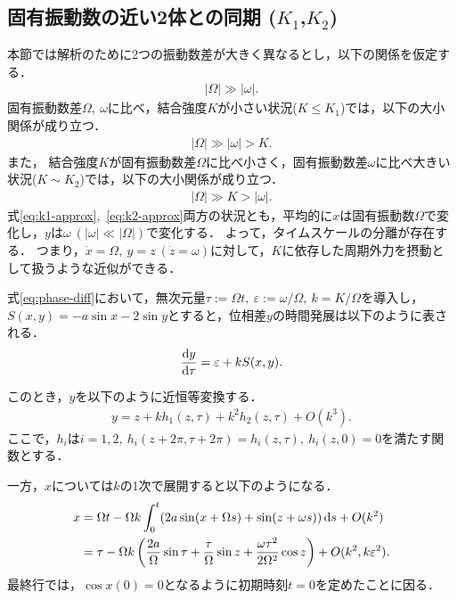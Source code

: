 \documentclass[../main]{subfiles}
\begin{document}
    \subsection{固有振動数の近い2体との同期 ($K_1$,$K_2$)}
    \label{sec:3body-k12}
    本節では解析のために2つの振動数差が大きく異なるとし，以下の関係を仮定する．
    \begin{align}
        \label{eq:assume}
        |\Omega|\gg|\omega|.
    \end{align}
    固有振動数差$\Omega,\ \omega$に比べ，結合強度$K$が小さい状況($K\leq K_1$)では，以下の大小関係が成り立つ．
    \begin{align}
        \label{eq:k1-approx}
        |\Omega|\gg|\omega|>K.
    \end{align}
    また，
    結合強度$K$が固有振動数差$\Omega$に比べ小さく，固有振動数差$\omega$に比べ大きい状況($K\sim K_2$)では，以下の大小関係が成り立つ．
    \begin{align}
        \label{eq:k2-approx}
        |\Omega|\gg K>|\omega|.
    \end{align}
    式\eqref{eq:k1-approx},\ \eqref{eq:k2-approx}両方の状況とも，平均的に$x$は固有振動数$\Omega$で変化し，$y$は$\omega\ (|\omega|\ll|\Omega|)$で変化する．
    よって，タイムスケールの分離が存在する．
    つまり，$\dot{x}=\Omega,\ y=z\ (\dot{z}=\omega)$に対して，$K$に依存した周期外力を摂動として扱うような近似ができる．

    式\eqref{eq:phase-diff}において，無次元量$\tau:=\Omega t,\ \varepsilon:=\omega/\Omega,\ k=K/\Omega$を導入し，$S(x,y)=-a\sin x-2\sin y$とすると，位相差$y$の時間発展は以下のように表される．
    \begin{align}
        \dv{y}{\tau}=\varepsilon+k S(x,y).
    \end{align}

    このとき，$y$を以下のように近恒等変換する．
    \begin{align}
        y=z+kh_1(z,\tau)+k^2h_2(z,\tau)+O(k^3).
        \label{eq:pertu-ytilde}
    \end{align}
    ここで，$h_i$は$i=1,2,\ h_i(z+2\pi,\tau+2\pi)=h_i(z,\tau),\ h_i(z,0)=0$を満たす関数とする．

    一方，$x$については$k$の1次で展開すると以下のようになる．
    \begin{align}
        x&=\Omega t-\Omega k\int_0^t(2a\sin(x+\Omega s)+\sin (z+\omega s))\dd{s}+O(k^2)\notag\\ 
        &=\tau-\Omega k\left(\frac{2a}{\Omega}\sin\tau+\frac{\tau}{\Omega}\sin z+\frac{\omega \tau^2}{2\Omega^2}\cos z\right)+O(k^2,k\varepsilon^2).\label{eq:x-series}
    \end{align}
    最終行では，$\cos x(0)=0$となるように初期時刻$t=0$を定めたことに因る．
    
\end{document}
